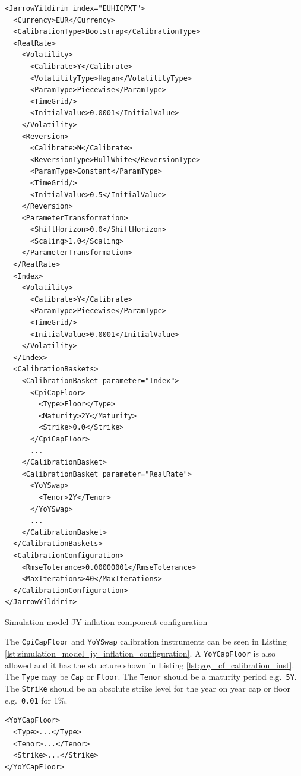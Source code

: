 \documentclass[12pt, a4paper]{article}
\begin{document}
{{\begin{listing}[H]
\begin{verbatim}
<JarrowYildirim index="EUHICPXT">
  <Currency>EUR</Currency>
  <CalibrationType>Bootstrap</CalibrationType>
  <RealRate>
    <Volatility>
      <Calibrate>Y</Calibrate>
      <VolatilityType>Hagan</VolatilityType>
      <ParamType>Piecewise</ParamType>
      <TimeGrid/>
      <InitialValue>0.0001</InitialValue>
    </Volatility>
    <Reversion>
      <Calibrate>N</Calibrate>
      <ReversionType>HullWhite</ReversionType>
      <ParamType>Constant</ParamType>
      <TimeGrid/>
      <InitialValue>0.5</InitialValue>
    </Reversion>
    <ParameterTransformation>
      <ShiftHorizon>0.0</ShiftHorizon>
      <Scaling>1.0</Scaling>
    </ParameterTransformation>
  </RealRate>
  <Index>
    <Volatility>
      <Calibrate>Y</Calibrate>
      <ParamType>Piecewise</ParamType>
      <TimeGrid/>
      <InitialValue>0.0001</InitialValue>
    </Volatility>
  </Index>
  <CalibrationBaskets>
    <CalibrationBasket parameter="Index">
      <CpiCapFloor>
        <Type>Floor</Type>
        <Maturity>2Y</Maturity>
        <Strike>0.0</Strike>
      </CpiCapFloor>
      ...
    </CalibrationBasket>
    <CalibrationBasket parameter="RealRate">
      <YoYSwap>
        <Tenor>2Y</Tenor>
      </YoYSwap>
      ...
    </CalibrationBasket>
  </CalibrationBaskets>
  <CalibrationConfiguration>
    <RmseTolerance>0.00000001</RmseTolerance>
    <MaxIterations>40</MaxIterations>
  </CalibrationConfiguration>
</JarrowYildirim>
\end{verbatim}
\caption{Simulation model JY inflation component configuration}
\label{lst:simulation_model_jy_inflation_configuration}
\end{listing}

The \lstinline!CpiCapFloor! and \lstinline!YoYSwap! calibration instruments can be seen in Listing \ref{lst:simulation_model_jy_inflation_configuration}. A \lstinline!YoYCapFloor! is 
also allowed and it has the structure shown in Listing \ref{lst:yoy_cf_calibration_inst}. The \lstinline!Type! may be \lstinline!Cap! or \lstinline!Floor!. The \lstinline!Tenor! should 
be a maturity period e.g.\ \lstinline!5Y!. The \lstinline!Strike! should be an absolute strike level for the year on year cap or floor e.g.\ \lstinline!0.01! for 1\%.

\begin{listing}[H]
\begin{verbatim}
<YoYCapFloor>
  <Type>...</Type>
  <Tenor>...</Tenor>
  <Strike>...</Strike>
</YoYCapFloor>
\end{verbatim}
\caption{Layout for \lstinline!YoYCapFloor! calibration instrument.}
\label{lst:yoy_cf_calibration_inst}
\end{listing}

}}
\end{document}
